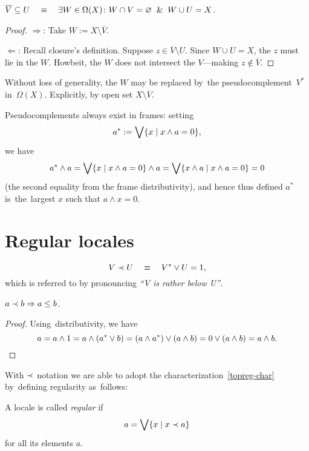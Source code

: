 \begin{lem}
  $\overline{V}\subseteq U \quad \equiv \quad \exists W\in \Omega(X)\colon W \cap V =
  \varnothing \;\; \& \;\; W \cup U = X$.
\end{lem}
\begin{proof}
  $\Rightarrow$:
  Take $W := X\setminus \overline{V}$.

  $\Leftarrow$:
  Recall closure's definition.
  Suppose $z\in \overline{V}\setminus U$.
  Since $W \cup U = X$, the $z$ must lie in the $W$.
  Howbeit, the $W$ does not intersect the $V$---making $z\not\in \overline{V}$.
\end{proof}

Without loss of generality, the $W$ may be replaced by~the
pseudocomplement~$V^*$ in~$\Omega(X)$.
Explicitly, by open set $X\setminus \overline{V}$.

\begin{rem}
Pseudocomplements always exist in frames:
setting
\[
  a^* := \bigvee \{x \mid x \wedge a = 0\},
\]
we have
\[
  a^* \wedge a = \bigvee \{x \mid x \wedge a = 0\} \wedge a = \bigvee \{x \wedge
  a \mid x \wedge a = 0\} = 0
\]
(the second equality from the frame distributivity), and hence thus defined
$a^*$ is~the~largest $x$ such that $a \wedge x = 0$.
\end{rem}

\section{Regular locales}

\begin{framed}
  \begin{nota}[$\rb$]
    \[
      V \prec U \quad \equiv \quad V^* \vee U = 1,
    \]
    which is referred to by pronouncing \emph{``V is rather below U''\/}.
  \end{nota}
\end{framed}

\begin{lem} \label{rb->leq}
  $a \prec b \Rightarrow a \leq b$.
\end{lem}
\begin{proof}
  Using~distributivity, we have
  \[
    a = a \wedge 1 = a \wedge (a^* \vee b) = (a \wedge a^*) \vee (a \wedge b) =
    0 \vee (a \wedge b) = a \wedge b. \qedhere
  \]
\end{proof}

With $\rb$ notation we are able to adopt the characterization~\ref{topreg-char}
by~defining regularity as~follows:
\begin{framed}
  \begin{df}[Reg]
    A locale is called \emph{regular\/} if
    \[
      a = \bigvee \{x \mid x \prec a\}
    \]
    for all its elements $a$.
  \end{df}
\end{framed}

